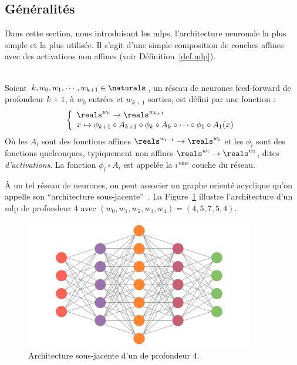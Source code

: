\subsection{Généralités}

Dans cette section, nous introduisant les \glspl{mlp},
l'architecture neuronale la plus simple et la plus utilisée.
Il s'agit d'une simple composition de couches affines avec des activations non affines 
(voir Définition~\ref{def.mlp}).


\begin{definition}\ \\
    \label{def.mlp}
    Soient \(k, w_0, w_1, \cdots, w_{k+1}\in\naturals\), 
    un réseau de neurones feed-forward de profondeur \(k+1\), à \(w_0\) entrées et \(w_{k+1}\) sorties, 
    est défini par une fonction :
    \begin{equation}
        \label{eq.mlp}
        \left\{
        \begin{array}{l}
            \reals^{w_0} \to \reals^{w_{k+1}}\\
            x\mapsto
            \phi_{k+1} \circ A_{k+1} \circ \phi_k \circ A_k \circ \cdots \circ \phi_1 \circ A_1(x)
        \end{array}
        \right.
    \end{equation}
    Où les \(A_i\) sont des fonctions affines \(\reals^{w_{i-1}}\to\reals^{w_i}\) 
    et les \(\phi_i\) sont des fonctions quelconques, typiquement non affines
    \(\reals^{w_i}\to\reals^{w_i}\), dites \emph{d'activations}.
    La fonction \(\phi_i\circ A_i\) est appelée la \(i^{\, \mathrm{eme}}\) couche du réseau.
\end{definition}

À un tel réseau de neurones, on peut associer un graphe orienté acyclique 
qu'on appelle son ``architecture sous-jacente''~\parencite{Kearns_Vazirani_1994}. 
La Figure~\ref{fig.mlp} illustre l'architecture d'un \gls{mlp} de profondeur 4
avec \({(w_0, w_1, w_2, w_3, w_4) = (4, 5, 7, 5, 4)}\).

\begin{figure}[hbt]
    \begin{center}
        \includegraphics[width=10cm]{assets/images/mlp.png}
    \end{center}
    \caption{Architecture sous-jacente d'un  de profondeur 4.}
    \label{fig.mlp}
\end{figure}

